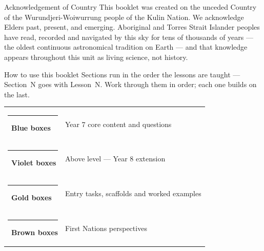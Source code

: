 \documentclass[11pt,a4paper]{article}
\begin{document}
\vspace{10pt}

\begin{fnbox}{Acknowledgement of Country}
This booklet was created on the unceded Country of the Wurundjeri-Woiwurrung people of the Kulin Nation. We acknowledge Elders past, present, and emerging. Aboriginal and Torres Strait Islander peoples have read, recorded and navigated by this sky for tens of thousands of years --- the oldest continuous astronomical tradition on Earth --- and that knowledge appears throughout this unit as living science, not history.
\end{fnbox}

\vspace{8pt}

\begin{infobox}{How to use this booklet}
Sections run in the order the lessons are taught --- Section~N goes with Lesson~N. Work through them in order; each one builds on the last.

\medskip
\begin{tabular}{@{}ll@{}}
  \textcolor{Space}{\rule{10pt}{10pt}}\ \textbf{Blue boxes}   & Year 7 core content and questions \\
  \textcolor{Violet}{\rule{10pt}{10pt}}\ \textbf{Violet boxes} & Above level --- Year 8 extension \\
  \textcolor{GoldDark}{\rule{10pt}{10pt}}\ \textbf{Gold boxes} & Entry tasks, scaffolds and worked examples \\
  \textcolor{Earth}{\rule{10pt}{10pt}}\ \textbf{Brown boxes}  & First Nations perspectives \\
\end{tabular}
\end{infobox}

\vspace{8pt}
\end{document}
